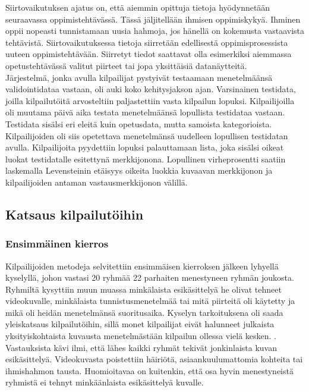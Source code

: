Siirtovaikutuksen ajatus on, että aiemmin opittuja tietoja hyödynnetään seuraavassa oppimistehtävässä. Tässä jäljitellään  
ihmisen oppimiskykyä. Ihminen oppii nopeasti tunnistamaan uusia hahmoja, jos hänellä on kokemusta vastaavista tehtävistä.
Siirtovaikutuksessa tietoja siirretään edellisestä oppimisprosessista uuteen oppimistehtävään.
Siirretyt tiedot saattavat olla esimerkiksi aiemmassa opetustehtävässä valitut piirteet tai jopa yksittäisiä datanäytteitä. \citep{5288526}\\

Järjestelmä, jonka avulla kilpailijat pystyivät testaamaan menetelmäänsä validointidataa vastaan, oli auki koko kehitysjakson ajan.
Varsinainen testidata, joilla kilpailutöitä arvosteltiin paljastettiin vasta kilpailun lopuksi. Kilpailijoilla oli muutama päivä aika
testata menetelmäänsä lopullista testidataa vastaan. Testidata sisälsi eri eleitä kuin opetusdata, mutta samoista kategorioista.
Kilpailijoiden oli siis opetettava menetelmänsä uudelleen lopullisen testidatan avulla. Kilpailijoita pyydettiin lopuksi
palauttamaan lista, joka sisälsi oikeat luokat testidatalle esitettynä merkkijonona. Lopullinen virheprosentti saatiin laskemalla Levensteinin etäisyys
oikeita luokkia kuvaavan merkkijonon ja kilpailijoiden antaman vastausmerkkijonon välillä. \citep{6239178} 


\subsection{Katsaus kilpailutöihin}
\subsubsection {Ensimmäinen kierros}
Kilpailijoiden metodeja selvitettiin ensimmäisen kierroksen jälkeen lyhyellä kyselyllä, johon vastasi 20 ryhmää 22 parhaiten menestyneen ryhmän joukosta.
Ryhmiltä kysyttiin muun muassa minkälaista esikäsittelyä he olivat tehneet videokuvalle, minkälaista tunnistusmenetelmää tai mitä piirteitä oli käytetty ja
mikä oli heidän menetelmänsä suoritusaika. Kyselyn tarkoituksena oli saada yleiskatsaus kilpailutöihin, sillä monet kilpailijat eivät
halunneet julkaista yksityiskohtaista kuvausta menetelmästään kilpailun ollessa vielä kesken. \citep {6239178}. \\

Vastauksista kävi ilmi, että lähes kaikki ryhmät tekivät jonkinlaista kuvan esikäsittelyä. Videokuvasta poistettiin häiriötä, asiaankuulumattomia 
kohteita tai ihmishahmon tausta. Huomioitavaa on kuitenkin, että osa hyvin menestyneistä ryhmistä ei tehnyt minkäänlaista esikäsittelyä kuvalle.
\citep {6239178}\\

